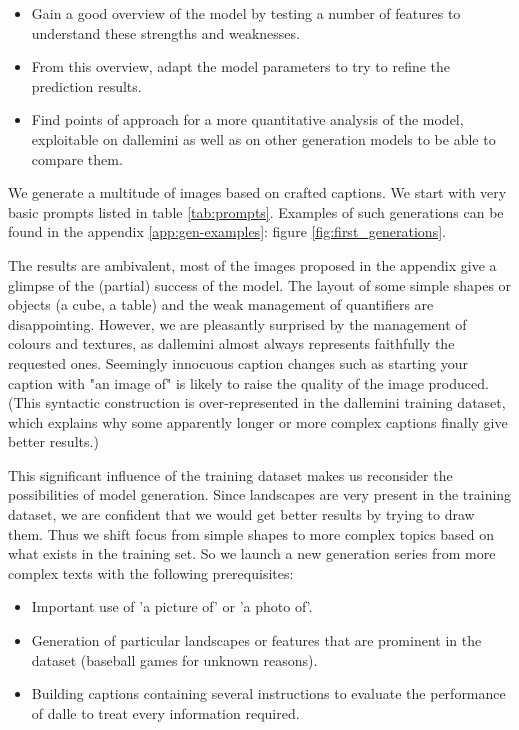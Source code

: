 \documentclass{article}
\begin{document}
\begin{multicols}{2}
\begin{itemize}
    \item Gain a good overview of the model by testing a number of features to understand these strengths and weaknesses.
    \item From this overview, adapt the model parameters to try to refine the prediction results. 
    \item Find points of approach for a more quantitative analysis of the model, exploitable on \gls{dallemini} as well as on other generation models to be able to compare them.
\end{itemize}

We generate a multitude of images based on crafted captions. We start with very basic prompts listed in table \ref{tab:prompts}. Examples of such generations can be found in the appendix \ref{app:gen-examples}: figure \ref{fig:first_generations}.

The results are ambivalent, most of the images proposed in the appendix give a glimpse of the (partial) success of the model. The layout of some simple shapes or objects (a cube, a table) and the weak management of quantifiers are disappointing.
However, we are pleasantly surprised by the management of colours and textures, as \gls{dallemini} almost always represents faithfully the requested ones.
Seemingly innocuous caption changes such as starting your caption with "an image of" is likely to raise the quality of the image produced.
(This syntactic construction is over-represented in the \gls{dallemini} training dataset, which explains why some apparently longer or more complex captions finally give better results.)

This significant influence of the training dataset makes us reconsider the possibilities of model generation. Since landscapes are very present in the training dataset, we are confident that we would get better results by trying to draw them.
Thus we shift focus from simple shapes to more complex topics based on what exists in the training set.
So we launch a new generation series from more complex texts with the following prerequisites:
\begin{itemize}
    \item Important use of 'a picture of' or 'a photo of'.
    \item Generation of particular landscapes or features that are prominent in the dataset (baseball games for unknown reasons).
    \item Building captions containing several instructions to evaluate the performance of \gls{dalle} to treat every information required.
\end{itemize}


\end{multicols}
\end{document}
